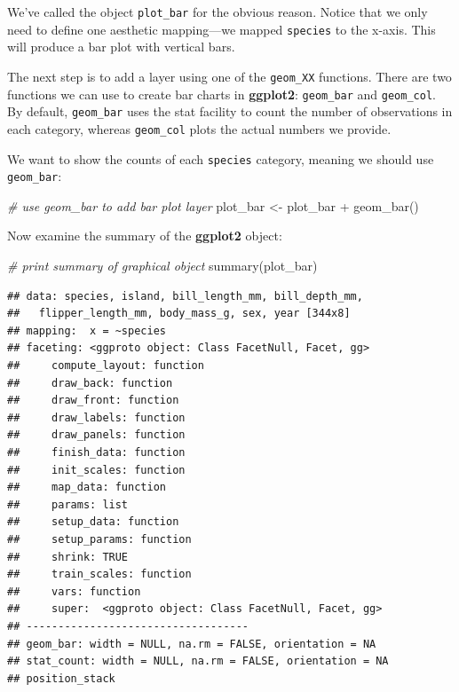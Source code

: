 \documentclass[
]{book}
\newenvironment{Shaded}{\begin{snugshade}}{\end{snugshade}}
\newcommand{\CommentTok}[1]{\textcolor[rgb]{0.56,0.35,0.01}{\textit{#1}}}
\newcommand{\FunctionTok}[1]{\textcolor[rgb]{0.00,0.00,0.00}{#1}}
\newcommand{\NormalTok}[1]{#1}
\newcommand{\OtherTok}[1]{\textcolor[rgb]{0.56,0.35,0.01}{#1}}
\newcommand{\SpecialCharTok}[1]{\textcolor[rgb]{0.00,0.00,0.00}{#1}}
\begin{document}
We've called the object \texttt{plot\_bar} for the obvious reason. Notice that we only need to define one aesthetic mapping---we mapped \texttt{species} to the x-axis. This will produce a bar plot with vertical bars.

The next step is to add a layer using one of the \texttt{geom\_XX} functions. There are two functions we can use to create bar charts in \textbf{ggplot2}: \texttt{geom\_bar} and \texttt{geom\_col}. By default, \texttt{geom\_bar} uses the stat facility to count the number of observations in each category, whereas \texttt{geom\_col} plots the actual numbers we provide.

We want to show the counts of each \texttt{species} category, meaning we should use \texttt{geom\_bar}:

\begin{Shaded}
\begin{Highlighting}[]
\CommentTok{\# use geom\_bar to add bar plot layer}
\NormalTok{plot\_bar }\OtherTok{\textless{}{-}}\NormalTok{ plot\_bar }\SpecialCharTok{+} \FunctionTok{geom\_bar}\NormalTok{()}
\end{Highlighting}
\end{Shaded}

Now examine the summary of the \textbf{ggplot2} object:

\begin{Shaded}
\begin{Highlighting}[]
\CommentTok{\# print summary of graphical object}
\FunctionTok{summary}\NormalTok{(plot\_bar) }
\end{Highlighting}
\end{Shaded}

\begin{verbatim}
## data: species, island, bill_length_mm, bill_depth_mm,
##   flipper_length_mm, body_mass_g, sex, year [344x8]
## mapping:  x = ~species
## faceting: <ggproto object: Class FacetNull, Facet, gg>
##     compute_layout: function
##     draw_back: function
##     draw_front: function
##     draw_labels: function
##     draw_panels: function
##     finish_data: function
##     init_scales: function
##     map_data: function
##     params: list
##     setup_data: function
##     setup_params: function
##     shrink: TRUE
##     train_scales: function
##     vars: function
##     super:  <ggproto object: Class FacetNull, Facet, gg>
## -----------------------------------
## geom_bar: width = NULL, na.rm = FALSE, orientation = NA
## stat_count: width = NULL, na.rm = FALSE, orientation = NA
## position_stack
\end{verbatim}
\end{document}
